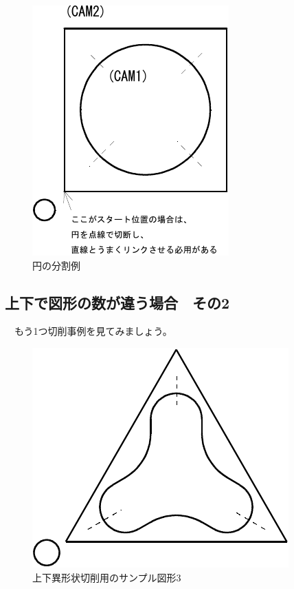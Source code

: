 \begin{minipage}{0.5\textwidth}
\begin{figure}[H]
\centering
\includegraphics{No2/fig/sample4-crop.pdf}
\caption{円の分割例}
\label{fig:sample4.pdf}
\end{figure}
\end{minipage}

\subsection{上下で図形の数が違う場合　その2}
　もう1つ切削事例を見てみましょう。

\begin{figure}[H]
\centering
\includegraphics{No2/fig/sample5-crop.pdf}
\caption{上下異形状切削用のサンプル図形3}
\label{fig:sample5.pdf}
\end{figure}

